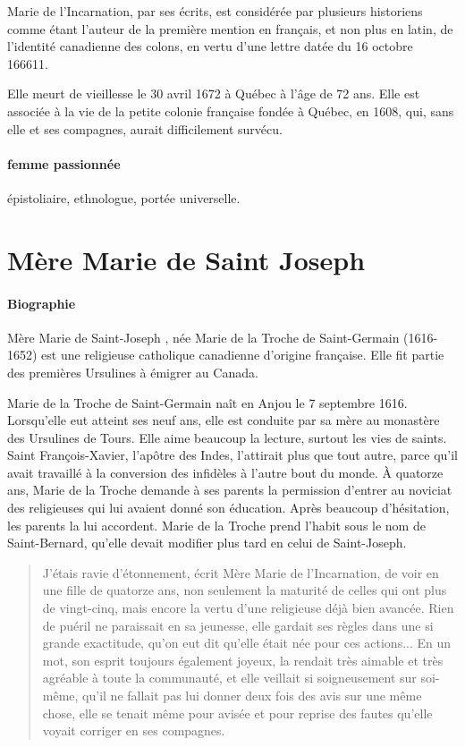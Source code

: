 Marie de l'Incarnation, par ses écrits, est considérée par plusieurs historiens comme étant l'auteur de la première mention en français, et non plus en latin, de l'identité canadienne des colons, en vertu d'une lettre datée du 16 octobre 166611.

Elle meurt de vieillesse le 30 avril 1672 à Québec à l'âge de 72 ans. Elle est associée à la vie de la petite colonie française fondée à Québec, en 1608, qui, sans elle et ses compagnes, aurait difficilement survécu.


\paragraph{femme passionnée} épistoliaire, ethnologue, portée universelle. 

\section{Mère Marie de Saint Joseph}

\paragraph{Biographie} Mère Marie de Saint-Joseph , née Marie de la Troche de Saint-Germain (1616-1652) est une religieuse catholique canadienne d'origine française. Elle fit partie des premières Ursulines à émigrer au Canada.


Marie de la Troche de Saint-Germain naît en Anjou le 7 septembre 1616. Lorsqu'elle eut atteint ses neuf ans, elle est conduite par sa mère au monastère des Ursulines de Tours. Elle aime beaucoup la lecture, surtout les vies de saints. Saint François-Xavier, l'apôtre des Indes, l'attirait plus que tout autre, parce qu'il avait travaillé à la conversion des infidèles à l'autre bout du monde. À quatorze ans, Marie de la Troche demande à ses parents la permission d'entrer au noviciat des religieuses qui lui avaient donné son éducation. Après beaucoup d'hésitation, les parents la lui accordent. Marie de la Troche prend l'habit sous le nom de Saint-Bernard, qu'elle devait modifier plus tard en celui de Saint-Joseph.
\begin{quote}
    J'étais ravie d'étonnement, écrit Mère Marie de l'Incarnation, de voir en une fille de quatorze ans, non seulement la maturité de celles qui ont plus de vingt-cinq, mais encore la vertu d'une religieuse déjà bien avancée. Rien de puéril ne paraissait en sa jeunesse, elle gardait ses règles dans une si grande exactitude, qu'on eut dit qu'elle était née pour ces actions... En un mot, son esprit toujours également joyeux, la rendait très aimable et très agréable à toute la communauté, et elle veillait si soigneusement sur soi-même, qu'il ne fallait pas lui donner deux fois des avis sur une même chose, elle se tenait même pour avisée et pour reprise des fautes qu'elle voyait corriger en ses compagnes.
\end{quote}


